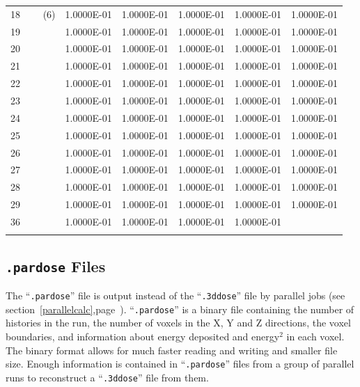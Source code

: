 \documentclass[12pt,twoside]{article}      %
\newcommand{\indexm}[1]{\index{#1}}
\begin{document}
\begin{table}[htbp]
\begin{center}
\begin{tabular}[t]{||p{1.5cm}|p{2.5cm}|p{2.5cm}|p{2.5cm}|p{2.5cm}|p{2.5cm}||}
18 ~~~~(6)    & 1.0000E-01    & 1.0000E-01    & 1.0000E-01    & 1.0000E-01 & 1.0000E-01   \\
19 & 1.0000E-01    & 1.0000E-01    & 1.0000E-01 & 1.0000E-01    & 1.0000E-01  \\
20  & 1.0000E-01    & 1.0000E-01 &  1.0000E-01    & 1.0000E-01    & 1.0000E-01   \\
21 & 1.0000E-01 & 1.0000E-01    & 1.0000E-01    & 1.0000E-01    & 1.0000E-01 \\
22    & 1.0000E-01    & 1.0000E-01    & 1.0000E-01    & 1.0000E-01 & 1.0000E-01   \\
23 & 1.0000E-01    & 1.0000E-01    & 1.0000E-01 &  1.0000E-01    & 1.0000E-01   \\
24 & 1.0000E-01    & 1.0000E-01 & 1.0000E-01    & 1.0000E-01    & 1.0000E-01   \\
25 & 1.0000E-01  &  1.0000E-01    & 1.0000E-01    & 1.0000E-01    & 1.0000E-01 \\
26    & 1.0000E-01    & 1.0000E-01    & 1.0000E-01    & 1.0000E-01 &  1.0000E-01   \\
27 & 1.0000E-01    & 1.0000E-01    & 1.0000E-01 &  1.0000E-01    & 1.0000E-01   \\
28 & 1.0000E-01    & 1.0000E-01 & 1.0000E-01    & 1.0000E-01    & 1.0000E-01    \\
29 & 1.0000E-01 &  1.0000E-01    & 1.0000E-01    & 1.0000E-01    & 1.0000E-01  \\
36    & 1.0000E-01    & 1.0000E-01    & 1.0000E-01    & 1.0000E-01 & \\
& & & & & \\
\hline\hline
\end{tabular}
\end{center}
\end{table}
\normalsize

\lfoot[]{}

\subsection{{\tt .pardose} Files}
\indexm{files!.pardose}
\indexm{.pardose}
The ``{\tt .pardose}'' file is output instead of the ``{\tt .3ddose}'' file
by parallel jobs
(see section~\ref{parallelcalc},page~\pageref{parallelcalc}).
``{\tt .pardose}'' is a binary file containing the number of histories
in the run, the number of voxels in the X, Y and Z directions, the
voxel boundaries, and information about energy deposited and energy$^2$
in each voxel.  The binary format allows for much faster reading and
writing and smaller file size.  Enough information is contained in
``{\tt .pardose}'' files from a group of parallel runs to reconstruct a
``{\tt .3ddose}'' file from them.
\indexm{.3ddose}
\end{document}
